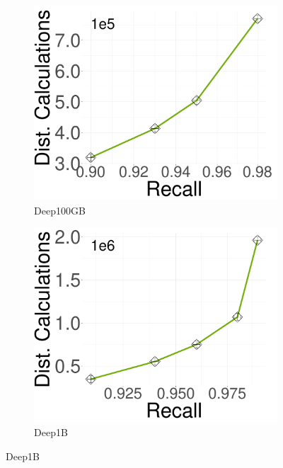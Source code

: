 \begin{figure}[ht]
\begin{subfigure}[b]{0.28\textwidth}
                \includegraphics[width=\textwidth]{../img/oigas/CandNeighbors/search/100GB/deep_DC.pdf}
                \caption{Deep100GB}
        \label{fig:oigas:cnn:100:deep}
    \end{subfigure}
    \hspace{0.4cm}
             \begin{subfigure}[b]{0.28\textwidth}
                 \captionsetup{justification=centering}
	\centering	
                \includegraphics[width=\textwidth]{../img/oigas/CandNeighbors/search/1B/deep_DC.pdf}
        \caption{Deep1B}
        \label{fig:oigas:cnn:1B:deep}
    \end{subfigure}


\end{figure}
